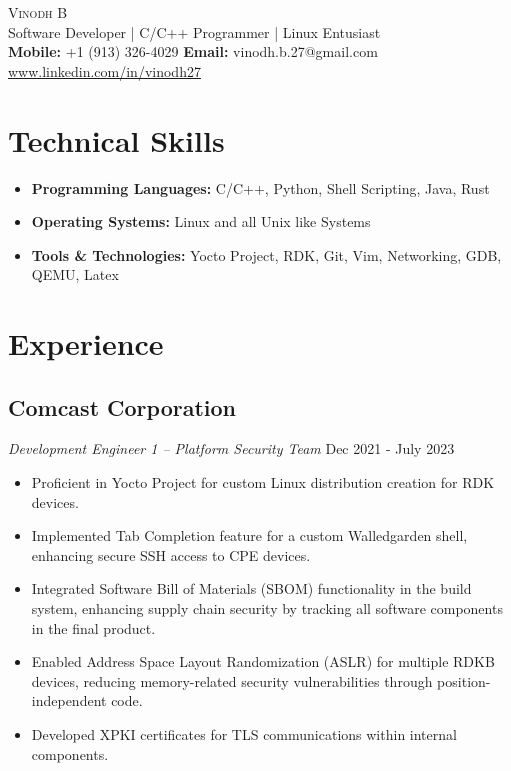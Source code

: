 \documentclass[10pt,a5paper]{article}
\renewcommand{\maketitle}[5]{
	\begin{center}
	\huge{\scshape{#1}} \\
	\vspace*{0.25em}
	\large{#2} \\
	\vspace*{0.25em}
	\textbf{Mobile:} {#3} \hspace*{0.5em}
	\textbf{Email:} {#4} \hspace*{0.5em}
	\url{#5}
	\end{center}
}
\begin{document}
\maketitle
{Vinodh B}
{Software Developer | C/C++ Programmer | Linux Entusiast}
{+1 (913) 326-4029}
{vinodh.b.27@gmail.com}
{www.linkedin.com/in/vinodh27}

\thispagestyle{empty}

\section{Technical Skills}
\begin{itemize}[leftmargin=3mm]
	\item{\textbf{Programming Languages: }C/C++, Python, Shell Scripting, Java, Rust}
	\item{\textbf{Operating Systems: }Linux and all Unix like Systems}
	\item{\textbf{Tools \& Technologies: }Yocto Project, RDK, Git, Vim, Networking, GDB, QEMU, Latex }
\end{itemize}

\section{Experience}
\subsection{Comcast Corporation}
\hspace*{0.25em}\textit{Development Engineer 1 -- Platform Security Team}
\hfill Dec 2021 - July 2023
\begin{itemize}[leftmargin=6mm]
	\setlength\itemsep{0em}
	\item{Proficient in Yocto Project for custom Linux distribution creation for RDK devices.}
	\item{Implemented Tab Completion feature for a custom Walledgarden shell, enhancing secure SSH access to CPE devices.}
	\item{Integrated Software Bill of Materials (SBOM) functionality in the build system, enhancing supply chain security by tracking all software components in the final product.}
	\item{Enabled Address Space Layout Randomization (ASLR) for multiple RDKB devices, reducing memory-related security vulnerabilities through position-independent code.}
	\item{Developed XPKI certificates for TLS communications within internal components.}
\end{itemize}
\end{document}
